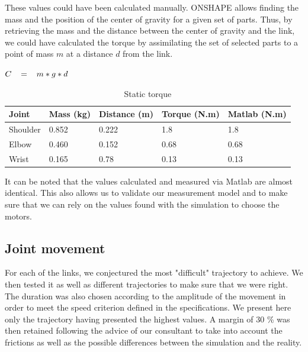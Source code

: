 \bigbreak
These values could have been calculated manually. ONSHAPE allows finding the mass and the position of the center of gravity for a given set of parts. Thus, by retrieving the mass and the distance between the center of gravity and the link, we could have calculated the torque by assimilating the set of selected parts to a point of mass $m$ at a distance $d$ from the link.
\begin{center}
    $C\hspace*{0.3cm}=\hspace*{0.3cm}m*g*d$
\end{center}
\begin{table}[ht]
    \centering
    \begin{tabular}{|p{1.5cm} | p{2cm} | p{2.5cm}| p{2.7cm} | p{2.7cm} |} 
        \hline
        \textbf{Joint} & \textbf{Mass (kg)} & \textbf{Distance (m)}& \textbf{Torque (N.m)}& \textbf{Matlab (N.m)}\\ [0.3ex] 
        \hline
        Shoulder & 0.852 & 0.222 & 1.8 & 1.8 \\ 
        \hline
        Elbow & 0.460 & 0.152 & 0.68 & 0.68 \\ 
        \hline
        Wrist & 0.165 & 0.78 & 0.13 & 0.13 \\ 
        \hline
    \end{tabular}
    \caption{Static torque}
\end{table}
\FloatBarrier

\bigbreak
It can be noted that the values calculated and measured via Matlab are almost identical. This also allows us to validate our measurement model and to make sure that we can rely on the values found with the simulation to choose the motors.

\subsection{Joint movement}

For each of the links, we conjectured the most "difficult" trajectory to achieve. We then tested it as well as different trajectories to make sure that we were right. The duration was also chosen according to the amplitude of the movement in order to meet the speed criterion defined in the specifications. We present here only the trajectory having presented the highest values. A margin of 30 \% was then retained following the advice of our consultant to take into account the frictions as well as the possible differences between the simulation and the reality.

